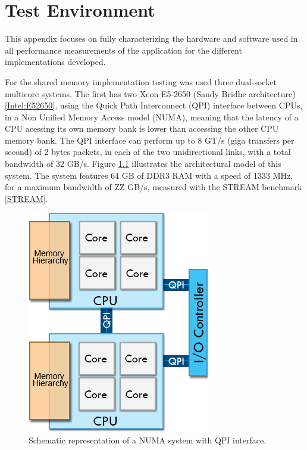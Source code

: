 \appendix
\chapter{Test Environment}
\label{App:TestEnv}

This appendix focuses on fully characterizing the hardware and software used in all performance measurements of the application for the different implementations developed.

For the shared memory implementation testing was used three dual-socket multicore systems. The first has two \intel Xeon E5-2650 (Sandy Bridhe architecture) \ref{Intel:E52650}, using the Quick Path Interconnect (QPI) interface between CPUs, in a Non Unified Memory Access model (NUMA), meaning that the latency of a CPU acessing its own memory bank is lower than accessing the other CPU memory bank. The QPI interface can perform up to 8 GT/s (giga transfers per second) of 2 bytes packets, in each of the two unidirectional links, with a total bandwidth of 32 GB/s. Figure \ref{fig:SystemModel} illustrates the architectural model of this system. The system features 64 GB of DDR3 RAM with a speed of 1333 MHz, for a maximum bandwidth of ZZ GB/s, measured with the STREAM benchmark \ref{STREAM}.

\begin{figure}[!htp]
	\begin{center}
		\includegraphics[scale=0.5]{../../common/img/numa_qpi.png}
		\caption{Schematic representation of a NUMA system with QPI interface.}
		\label{fig:SystemModel}
	\end{center}
\end{figure}


